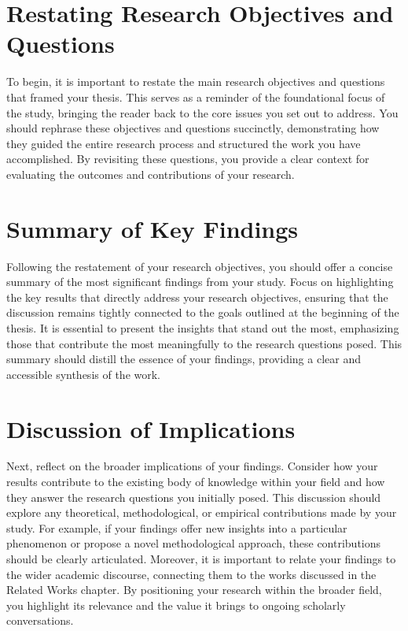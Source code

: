 \documentclass{iutbscthesis}
\begin{document}
\section{Restating Research Objectives and Questions}

To begin, it is important to restate the main research objectives and questions that framed your thesis. This serves as a reminder of the foundational focus of the study, bringing the reader back to the core issues you set out to address. You should rephrase these objectives and questions succinctly, demonstrating how they guided the entire research process and structured the work you have accomplished. By revisiting these questions, you provide a clear context for evaluating the outcomes and contributions of your research.

\section{Summary of Key Findings}

Following the restatement of your research objectives, you should offer a concise summary of the most significant findings from your study. Focus on highlighting the key results that directly address your research objectives, ensuring that the discussion remains tightly connected to the goals outlined at the beginning of the thesis. It is essential to present the insights that stand out the most, emphasizing those that contribute the most meaningfully to the research questions posed. This summary should distill the essence of your findings, providing a clear and accessible synthesis of the work.

\section{Discussion of Implications}

Next, reflect on the broader implications of your findings. Consider how your results contribute to the existing body of knowledge within your field and how they answer the research questions you initially posed. This discussion should explore any theoretical, methodological, or empirical contributions made by your study. For example, if your findings offer new insights into a particular phenomenon or propose a novel methodological approach, these contributions should be clearly articulated. Moreover, it is important to relate your findings to the wider academic discourse, connecting them to the works discussed in the Related Works chapter. By positioning your research within the broader field, you highlight its relevance and the value it brings to ongoing scholarly conversations.
\end{document}
